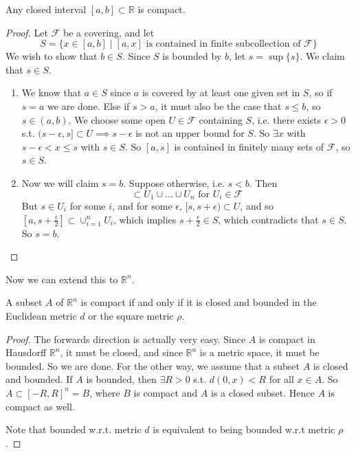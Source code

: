   \begin{lemma}
    \label{thm:closed-intervals-are-compact}
    Any closed interval $[a, b] \subset \mathbb{R}$ is compact. 
  \end{lemma} 
  \begin{proof}
    Let $\mathcal{F}$ be a covering, and let 
    \begin{equation}
      S = \{x \in [a, b] \mid [a, x] \text{ is contained in finite subcollection of } \mathcal{F} \}
    \end{equation}
    We wish to show that $b \in S$. Since $S$ is bounded by $b$, let $s = \sup\{s\}$. We claim that $s \in S$. 
    \begin{enumerate}
      \item We know that $a \in S$ since $a$ is covered by at least one given set in $S$, so if $s = a$ we are done. Else if $s > a$, it must also be the case that $s \leq b$, so $s \in (a, b)$. We choose some open $U \in \mathcal{F}$ containing $S$, i.e. there exists $\epsilon > 0$ s.t. $(s - \epsilon, s] \subset U \implies s - \epsilon$ is not an upper bound for $S$. So $\exists x$ with $s - \epsilon < x \leq s$ with $s \in S$. So $[a, s]$ is contained in finitely many sets of $\mathcal{F}$, so $s \in S$. 

      \item Now we will claim $s = b$. Suppose otherwise, i.e. $s < b$. Then 
      \begin{equation}
        [a, s] \subset U_1 \cup \ldots \cup U_n \text{ for } U_i \in \mathcal{F}
      \end{equation}
      But $s \in U_i$ for some $i$, and for some $\epsilon$, $[s, s + \epsilon) \subset U$, and so $[a, s + \frac{\epsilon}{2}] \subset \cup_{i=1}^{n} U_i$, which implies $s + \frac{\epsilon}{2} \in S$, which contradicts that $s \in S$. So $s = b$. 
    \end{enumerate}
  \end{proof}

  Now we can extend this to $\mathbb{R}^n$. 

  \begin{theorem}
    \label{thm:heine-borel-theorem}
    A subset $A$ of $\mathbb{R}^n$ is compact if and only if it is closed and bounded in the Euclidean metric $d$ or the square metric $\rho$. 
  \end{theorem}
  \begin{proof}
    The forwards direction is actually very easy. Since $A$ is compact in Hausdorff $\mathbb{R}^n$, it must be closed, and since $\mathbb{R}^n$ is a metric space, it must be bounded. So we are done. For the other way, we assume that a subset $A$ is closed and bounded. If $A$ is bounded, then $\exists R > 0$ s.t. $d(0, x) < R$ for all $x \in A$. So $A \subset [-R, R]^n = B$, where $B$ is compact and $A$ is a closed subset. Hence $A$ is compact as well. 

    Note that bounded w.r.t. metric $d$ is equivalent to being bounded w.r.t metric $\rho$. 
  \end{proof}


